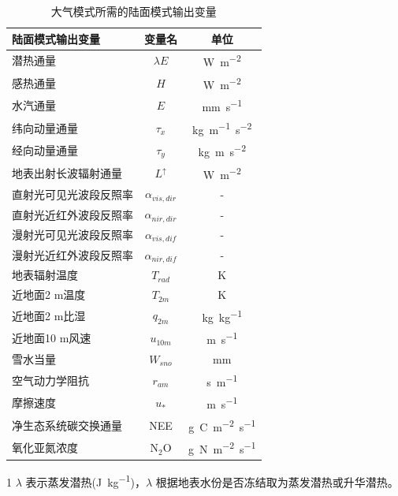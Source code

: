 {
\begin{table}[htbp]
\centering
\caption{大气模式所需的陆面模式输出变量}
\label{tab:大气模式所需的陆面模式输出变量}
\begin{threeparttable}
\begin{tabular}{lcc}
\toprule
陆面模式输出变量    & 变量名                            & 单位      \\ \midrule
潜热通量        & $\lambda E$ & \unit{W.m^{-2}}    \\
感热通量        & $H$                    & \unit{W.m^{-2}}    \\
水汽通量        & $E$                    & \unit{mm.s^{-1}}    \\
纬向动量通量      & $\tau_{x}$      & \unit{kg.m^{-1}.s^{-2}} \\
经向动量通量      & $\tau_{y}$      & \unit{kg.m.s^{-2}} \\
地表出射长波辐射通量  & $L ^\uparrow$    & \unit{W.m^{-2}}    \\
直射光可见光波段反照率 & $\alpha_{vis,dir}$             & -       \\
直射光近红外波段反照率 & $\alpha_{nir,dir}$             & -       \\
漫射光可见光波段反照率 & $\alpha_{vis,dif}$             & -       \\
漫射光近红外波段反照率 & $\alpha_{nir,dif}$             & -       \\
地表辐射温度      & $T_{rad}$                      & K       \\
近地面2 m温度     & $T_{2m}$                       & K       \\
近地面2 m比湿     & $q_{2m}$                       & \unit{kg.kg^{-1}}   \\
近地面10 m风速    & $u_{10m}$                      & \unit{m.s^{-1}}     \\
雪水当量        & $W_{sno}$                      & mm      \\
空气动力学阻抗     & $r_{am}$                       & \unit{s.m^{-1}}     \\
摩擦速度        & $u_\ast$                       & \unit{m.s^{-1}}     \\
净生态系统碳交换通量  &   NEE                      & \unit{g.C.m^{-2}.s^{-1}} \\
氧化亚氮浓度      & $\mathrm{N_2O}$               & \unit{g.N.m^{-2}.s^{-1}}\\
\bottomrule         
\end{tabular}
\begin{tablenotes}
\footnotesize
\item[1] $\lambda$ 表示蒸发潜热(\unit{J.kg^{-1}})，$\lambda$ 根据地表水份是否冻结取为蒸发潜热或升华潜热。
\end{tablenotes}
\end{threeparttable}
\end{table}
}


